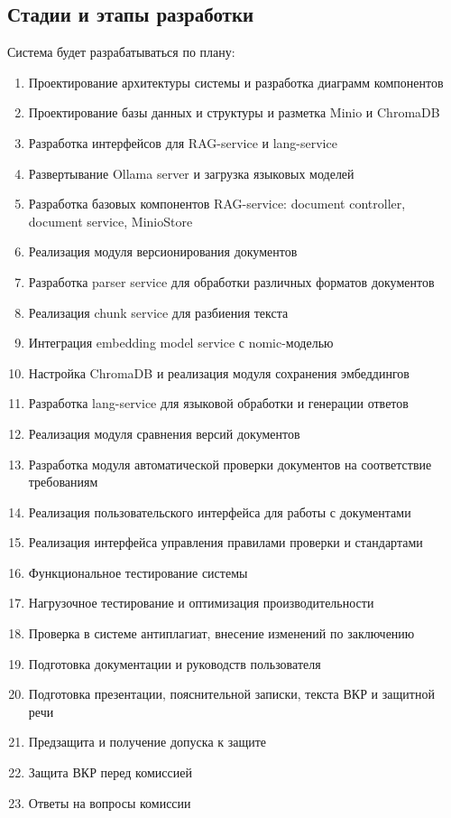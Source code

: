 \subsection{Стадии и этапы разработки}
Система будет разрабатываться по плану:
\begin{enumerate}[label=\arabic*., nosep, leftmargin=*, labelindent=\parindent]
  \item Проектирование архитектуры системы и разработка диаграмм компонентов
  \item Проектирование базы данных и структуры и разметка Minio и ChromaDB
  \item Разработка интерфейсов для RAG-service и lang-service
  \item Развертывание Ollama server и загрузка языковых моделей
  \item Разработка базовых компонентов RAG-service: document controller, document service, MinioStore
  \item Реализация модуля версионирования документов
  \item Разработка parser service для обработки различных форматов документов
  \item Реализация chunk service для разбиения текста
  \item Интеграция embedding model service с nomic-моделью
  \item Настройка ChromaDB и реализация модуля сохранения эмбеддингов
  \item Разработка lang-service для языковой обработки и генерации ответов
  \item Реализация модуля сравнения версий документов
  \item Разработка модуля автоматической проверки документов на соответствие требованиям
  \item Реализация пользовательского интерфейса для работы с документами
  \item Реализация интерфейса управления правилами проверки и стандартами
  \item Функциональное тестирование системы
  \item Нагрузочное тестирование и оптимизация производительности
  \item Проверка в системе антиплагиат, внесение изменений по заключению
  \item Подготовка документации и руководств пользователя
  \item Подготовка презентации, пояснительной записки, текста ВКР и защитной речи
  \item Предзащита и получение допуска к защите
  \item Защита ВКР перед комиссией
  \item Ответы на вопросы комиссии
\end{enumerate}

